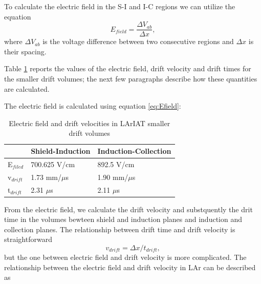 To calculate the electric field in the S-I and I-C regions we can utilize the equation
\begin{equation} E_{field}=\frac{\Delta V_{ab}}{\Delta x}, \label{eq:Efield}
\end{equation}
where $\Delta V_{ab}$ is the voltage difference between two consecutive regions and $\Delta x$ is their spacing.

Table \ref{tab:Efields} reports the values of the electric field, drift velocity and drift times for the smaller drift volumes; the next few paragraphs describe how these quantities are calculated.

  

The electric field is calculated using equation \ref{eq:Efield}:







 
\begin{table}[]
\centering
\caption{Electric field and drift velocities in LArIAT smaller drift volumes}
\label{tab:Efields}
\begin{tabular}{|l|l|l|}
\hline
& Shield-Induction & Induction-Collection \\ \hline
E$_{filed}$ &                 700.625 V/cm        &                892.5  V/cm             \\ \hline
v$_{drift}$ &                   1.73  mm/$\mu$s   &                  1.90 mm/$\mu$s        \\ \hline
t$_{drift}$ &                   2.31  $\mu$s      &                   2.11 $\mu$s          \\ \hline

\end{tabular}
\end{table}

From the electric field, we calculate the drift velocity and substquently the drit time in the volumes bewteen shield and induction planes and induction and collection planes.
The relationship between drift time and drift velocity is straightforward 
\begin{equation}
v_{drift} = \Delta x/t_{drift}, \label{eq:drifttime}
\end{equation}
but the one between  electric field and drift velocity is more complicated. The relationship between the electric field and drift velocity in LAr can be described as 






